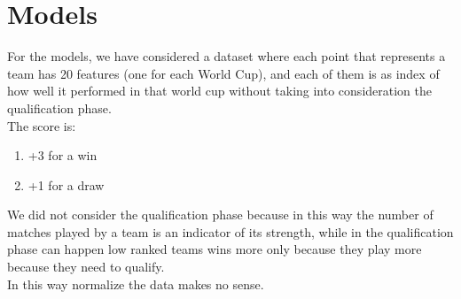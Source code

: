 \documentclass[journal]{vgtc}                %
\begin{document}
\section{Models}
For the models, we have considered a dataset where each point that represents a team has 20 features (one for each World Cup), and each of them is as index of how well it performed in that world cup without taking into consideration the qualification phase.\\The score is:
\begin{enumerate}
\item +3 for a win
\item +1 for a draw
\end{enumerate}
We did not consider the qualification phase because in this way the number of matches played by a team is an indicator of its strength, while in the qualification phase can happen low ranked teams wins more only because they play more because they need to qualify.\\In this way normalize the data makes no sense.
\end{document}
